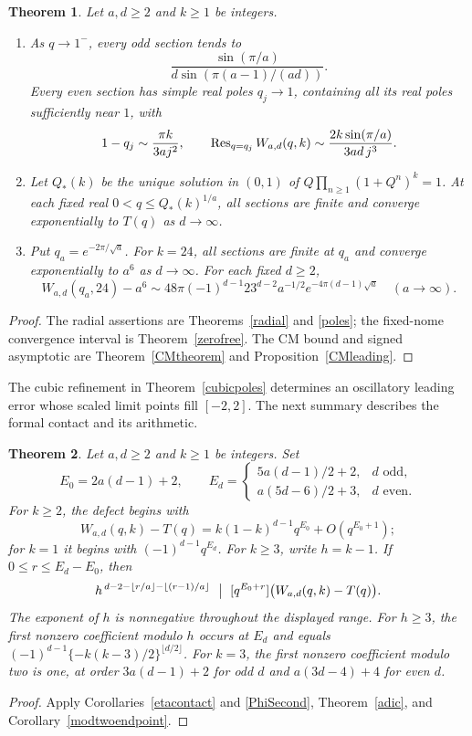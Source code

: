 \documentclass[11pt]{amsart}
\newtheorem{theorem}{Theorem}[section]
\theoremstyle{definition}
\theoremstyle{remark}
\numberwithin{equation}{section}
\begin{document}
\begin{theorem}\label{main}
Let $a,d\ge2$ and $k\ge1$ be integers.
\begin{enumerate}
\item As $q\to1^-$, every odd section tends to
\[
 \frac{\sin(\pi/a)}{d\sin(\pi(a-1)/(ad))}.
\]
Every even section has simple real poles $q_j\to1$, containing all its real poles sufficiently near $1$, with
\[
 1-q_j\sim\frac{\pi k}{3aj^2},\qquad
 \operatorname{Res}_{q=q_j}W_{a,d}(q,k)\sim\frac{2k\sin(\pi/a)}{3ad\,j^3}.
\]
\item Let $Q_*(k)$ be the unique solution in $(0,1)$ of
$Q\prod_{n\ge1}(1+Q^n)^k=1$. At each fixed real $0<q\le Q_*(k)^{1/a}$, all sections are finite and converge exponentially to $T(q)$ as $d\to\infty$.
\item Put $q_a=e^{-2\pi/\sqrt a}$. For $k=24$, all sections are finite at $q_a$ and converge exponentially to $a^6$ as $d\to\infty$. For each fixed $d\ge2$,
\[
 W_{a,d}(q_a,24)-a^6
 \sim48\pi(-1)^{d-1}23^{d-2}a^{-1/2}e^{-4\pi(d-1)\sqrt a}
 \quad(a\to\infty).
\]
\end{enumerate}
\end{theorem}
\begin{proof}
The radial assertions are Theorems~\ref{radial} and \ref{poles}; the fixed-nome convergence interval is Theorem~\ref{zerofree}. The CM bound and signed asymptotic are Theorem~\ref{CMtheorem} and Proposition~\ref{CMleading}.
\end{proof}

The cubic refinement in Theorem~\ref{cubicpoles} determines an oscillatory leading error whose scaled limit points fill $[-2,2]$. The next summary describes the formal contact and its arithmetic.

\begin{theorem}\label{mainformal}
Let $a,d\ge2$ and $k\ge1$ be integers. Set
\[
 E_0=2a(d-1)+2,\qquad
 E_d=\begin{cases}5a(d-1)/2+2,&d\text{ odd},\\a(5d-6)/2+3,&d\text{ even}.\end{cases}
\]
For $k\ge2$, the defect begins with
\[
 W_{a,d}(q,k)-T(q)=k(1-k)^{d-1}q^{E_0}+O(q^{E_0+1});
\]
for $k=1$ it begins with $(-1)^{d-1}q^{E_d}$. For $k\ge3$, write $h=k-1$. If $0\le r\le E_d-E_0$, then
\[
 h^{\,d-2-\lfloor r/a\rfloor-\lfloor(r-1)/a\rfloor}
 \ \bigm|\ [q^{E_0+r}]\bigl(W_{a,d}(q,k)-T(q)\bigr).
\]
The exponent of $h$ is nonnegative throughout the displayed range. For $h\ge3$, the first nonzero coefficient modulo $h$ occurs at $E_d$ and equals
$(-1)^{d-1}\{-k(k-3)/2\}^{\lfloor d/2\rfloor}$. For $k=3$, the first nonzero coefficient modulo two is one, at order $3a(d-1)+2$ for odd $d$ and $a(3d-4)+4$ for even $d$.
\end{theorem}
\begin{proof}
Apply Corollaries~\ref{etacontact} and \ref{PhiSecond}, Theorem~\ref{adic}, and Corollary~\ref{modtwoendpoint}.
\end{proof}
\end{document}
